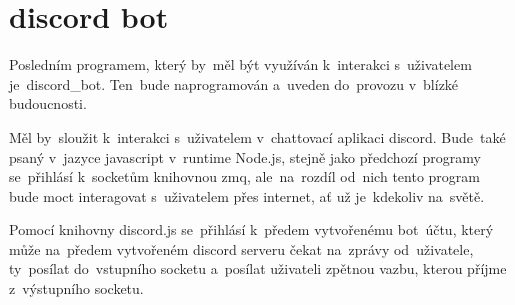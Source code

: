

\section{discord bot}

Posledním programem, který by~měl být využíván k~interakci s~uživatelem je~discord\_bot. Ten~bude naprogramován a~uveden do~provozu v~blízké budoucnosti.

Měl by~sloužit k~interakci s~uživatelem v~chattovací aplikaci discord. Bude~také psaný v~jazyce javascript v~runtime Node.js, stejně jako předchozí programy se~přihlásí k~socketům knihovnou zmq, ale~na~rozdíl od~nich tento program bude moct interagovat s~uživatelem přes internet, ať už je~kdekoliv na~světě.

Pomocí knihovny discord.js se~přihlásí k~předem vytvořenému bot~účtu, který může na~předem vytvořeném discord serveru čekat na~zprávy od~uživatele, ty~posílat do~vstupního socketu a~posílat uživateli zpětnou vazbu, kterou příjme z~výstupního socketu.
